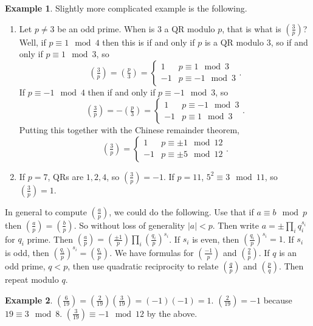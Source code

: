 \documentclass{article}
\newcommand{\rb}[1]{\left( #1 \right)}
\newcommand{\abs}[1]{\left\lvert #1 \right\rvert}
\newcommand{\legendre}[2]{\rb{\tfrac{#1}{#2}}}
\theoremstyle{definition}\newtheorem{definition}{Definition}
\theoremstyle{definition}\newtheorem{remark}[definition]{Remark}
\theoremstyle{definition}\newtheorem*{example}{Example}
\theoremstyle{definition}\newtheorem*{note}{Note}
\begin{document}
\begin{example}
Slightly more complicated example is the following.
\begin{enumerate}
\item Let $ p \ne 3 $ be an odd prime. When is $ 3 $ a QR modulo $ p $, that is what is $ \legendre{3}{p} $? Well, if $ p \equiv 1 \mod 4 $ then this is if and only if $ p $ is a QR modulo $ 3 $, so if and only if $ p \equiv 1 \mod 3 $, so
$$ \legendre{3}{p} = \legendre{p}{3} = \begin{cases} 1 & p \equiv 1 \mod 3 \\ -1 & p \equiv -1 \mod 3 \end{cases}. $$
If $ p \equiv -1 \mod 4 $ then if and only if $ p \equiv -1 \mod 3 $, so
$$ \legendre{3}{p} = -\legendre{p}{3} = \begin{cases} 1 & p \equiv -1 \mod 3 \\ -1 & p \equiv 1 \mod 3 \end{cases}. $$
Putting this together with the Chinese remainder theorem,
$$ \legendre{3}{p} = \begin{cases} 1 & p \equiv \pm 1 \mod 12 \\ -1 & p \equiv \pm 5 \mod 12 \end{cases}. $$
\item If $ p = 7 $, QRs are $ 1, 2, 4 $, so $ \legendre{3}{p} = -1 $. If $ p = 11 $, $ 5^2 \equiv 3 \mod 11 $, so $ \legendre{3}{p} = 1 $.
\end{enumerate}
\end{example}

In general to compute $ \legendre{a}{p} $, we could do the following. Use that if $ a \equiv b \mod p $ then $ \legendre{a}{p} = \legendre{b}{p} $. So without loss of generality $ \abs{a} < p $. Then write $ a = \pm \prod_i q_i^{s_i} $ for $ q_i $ prime. Then $ \legendre{a}{p} = \legendre{\pm 1}{p} \prod_i \legendre{q_i}{p}^{s_i} $. If $ s_i $ is even, then $ \legendre{q_i}{p}^{s_i} = 1 $. If $ s_i $ is odd, then $ \legendre{q_i}{p}^{s_i} = \legendre{q_i}{p} $. We have formulas for $ \legendre{-1}{p} $ and $ \legendre{2}{p} $. If $ q $ is an odd prime, $ q < p $, then use quadratic reciprocity to relate $ \legendre{q}{p} $ and $ \legendre{p}{q} $. Then repeat modulo $ q $.

\begin{example}
$ \legendre{6}{19} = \legendre{2}{19}\legendre{3}{19} = \rb{-1}\rb{-1} = 1 $. $ \legendre{2}{19} = -1 $ because $ 19 \equiv 3 \mod 8 $. $ \legendre{3}{19} \equiv -1 \mod 12 $ by the above.
\end{example}
\end{document}
